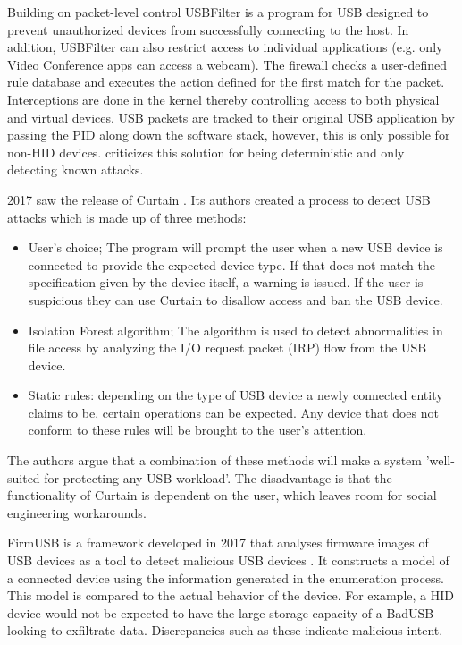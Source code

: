 Building on packet-level control USBFilter \cite{tianMakingUSBGreat2016} is a program for USB designed to prevent unauthorized devices from successfully connecting to the host. In addition, USBFilter can also restrict access to individual applications (e.g. only Video Conference apps can access a webcam). The firewall checks a user-defined rule database and executes the action defined for the first match for the packet. Interceptions are done in the kernel thereby controlling access to both physical and virtual devices. USB packets are tracked to their original USB application by passing the PID along down the software stack, however, this is only possible for non-HID devices.
\cite{nissimUSBbasedAttacks2017} criticizes this solution for being deterministic and only detecting known attacks. 

2017 saw the release of Curtain \cite{fuCurtainKeepYour2017}. Its authors created a process to detect USB attacks which is made up of three methods:
\begin{itemize}
    \item User's choice; The program will prompt the user when a new USB device is connected to provide the expected device type. If that does not match the specification given by the device itself, a warning is issued. If the user is suspicious they can use Curtain to disallow access and ban the USB device.
    \item Isolation Forest algorithm; The algorithm is used to detect abnormalities in file access by analyzing the I/O request packet (IRP) flow from the USB device. 
    \item Static rules: depending on the type of USB device a newly connected entity claims to be, certain operations can be expected. Any device that does not conform to these rules will be brought to the user's attention. 
\end{itemize}
The authors argue that a combination of these methods will make a system 'well-suited for protecting any USB workload'.  The disadvantage is that the functionality of Curtain is dependent on the user, which leaves room for social engineering workarounds.  

FirmUSB is a framework developed in 2017 that analyses firmware images of USB devices as a tool to detect malicious USB devices \cite{hernandezFirmUSBVettingUSB2017}. It constructs a model of a connected device using the information generated in the enumeration process. This model is compared to the actual behavior of the device. For example, a HID device would not be expected to have the large storage capacity of a BadUSB looking to exfiltrate data. Discrepancies such as these indicate malicious intent. 

